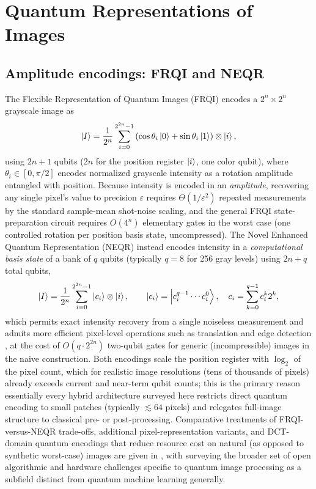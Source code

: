 \documentclass[11pt]{article}
\begin{document}
\section{Quantum Representations of Images}
\label{sec:qip}

\subsection{Amplitude encodings: FRQI and NEQR}
The Flexible Representation of Quantum Images (FRQI) \cite{Le2011} encodes a $2^n\times 2^n$ grayscale image as
\begin{equation}
\ket{I} = \frac{1}{2^n}\sum_{i=0}^{2^{2n}-1}\left(\cos\theta_i\ket{0} + \sin\theta_i\ket{1}\right)\otimes\ket{i},
\end{equation}
using $2n+1$ qubits ($2n$ for the position register $\ket{i}$, one color qubit), where $\theta_i\in[0,\pi/2]$ encodes normalized grayscale intensity as a rotation amplitude entangled with position. Because intensity is encoded in an \emph{amplitude}, recovering any single pixel's value to precision $\varepsilon$ requires $\Theta(1/\varepsilon^2)$ repeated measurements by the standard sample-mean shot-noise scaling, and the general FRQI state-preparation circuit requires $O(4^n)$ elementary gates in the worst case (one controlled rotation per position basis state, uncompressed). The Novel Enhanced Quantum Representation (NEQR) \cite{Zhang2013} instead encodes intensity in a \emph{computational basis state} of a bank of $q$ qubits (typically $q=8$ for 256 gray levels) using $2n+q$ total qubits,
\begin{equation}
\ket{I} = \frac{1}{2^n}\sum_{i=0}^{2^{2n}-1}\ket{c_i}\otimes\ket{i}, \qquad \ket{c_i}=\ket{c^{q-1}_i\cdots c^{0}_i}, \quad c_i = \sum_{k=0}^{q-1} c_i^k 2^k,
\end{equation}
which permits exact intensity recovery from a single noiseless measurement and admits more efficient pixel-level operations such as translation and edge detection \cite{Zhou2017,Yao2017}, at the cost of $O(q\cdot 2^{2n})$ two-qubit gates for generic (incompressible) images in the naive construction. Both encodings scale the position register with $\log_2$ of the pixel count, which for realistic image resolutions (tens of thousands of pixels) already exceeds current and near-term qubit counts; this is the primary reason essentially every hybrid architecture surveyed here restricts direct quantum encoding to small patches (typically $\lesssim 64$ pixels) and relegates full-image structure to classical pre- or post-processing. Comparative treatments of FRQI-versus-NEQR trade-offs, additional pixel-representation variants, and DCT-domain quantum encodings that reduce resource cost on natural (as opposed to synthetic worst-case) images are given in \cite{QIPSystematicReview2025,QuantumImageRepClassification2025}, with \cite{Chakraborty2018} surveying the broader set of open algorithmic and hardware challenges specific to quantum image processing as a subfield distinct from quantum machine learning generally.
\end{document}
